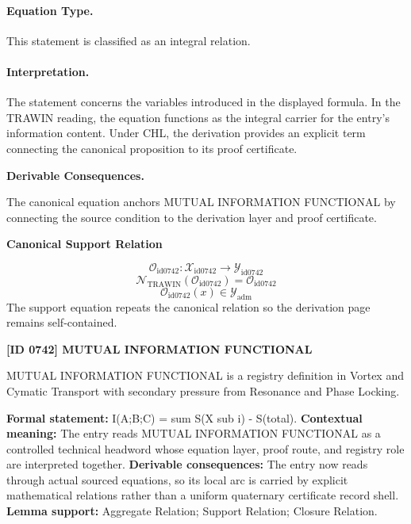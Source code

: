 \paragraph{Equation Type.}
This statement is classified as an integral relation.

\paragraph{Interpretation.}
The statement concerns the variables introduced in the displayed formula. In the TRAWIN reading, the equation functions as the integral carrier for the entry’s information content. Under CHL, the derivation provides an explicit term connecting the canonical proposition to its proof certificate.

\par\vspace{0.35em}
\noindent\textbf{Derivable Consequences.}\quad
\begingroup
\footnotesize
\raggedright
The canonical equation anchors MUTUAL INFORMATION FUNCTIONAL by connecting the source condition to the derivation layer and proof certificate.
\par\endgroup

\noindent\textbf{Canonical Support Relation}\par
\[
\mathcal{O}_{\mathrm{id0742}}:\mathcal{X}_{\mathrm{id0742}}\longrightarrow\mathcal{Y}_{\mathrm{id0742}}
\]
\[
\mathcal{N}_{\mathrm{TRAWIN}}(\mathcal{O}_{\mathrm{id0742}})=\mathcal{O}_{\mathrm{id0742}}
\]
\[
\mathcal{O}_{\mathrm{id0742}}(x)\in\mathcal{Y}_{\mathrm{adm}}
\]
\noindent The support equation repeats the canonical relation so the derivation page remains self-contained.\par

\clearpage
\noindent\textbf{[ID 0742] MUTUAL INFORMATION FUNCTIONAL}\par
\vspace{0.35em}
\begingroup\small
{}
MUTUAL INFORMATION FUNCTIONAL is a registry definition in Vortex and Cymatic Transport with secondary pressure from Resonance and Phase Locking.

\begingroup\footnotesize\setlength{\emergencystretch}{3em}\sloppy
\textbf{Formal statement:} I(A;B;C) = sum S(X sub i) - S(total). \textbf{Contextual meaning:} The entry reads MUTUAL INFORMATION FUNCTIONAL as a controlled technical headword whose equation layer, proof route, and registry role are interpreted together. \textbf{Derivable consequences:} The entry now reads through actual sourced equations, so its local arc is carried by explicit mathematical relations rather than a uniform quaternary certificate record shell. \textbf{Lemma support:} Aggregate Relation; Support Relation; Closure Relation.\par
\endgroup

